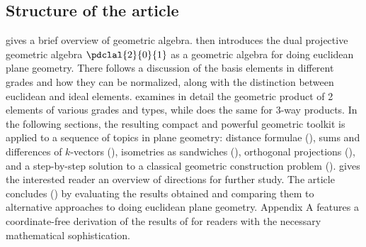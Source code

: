 \documentclass[12pt]{article}
\begin{document}
\subsection{Structure of the article} 
{
 gives a brief overview of geometric algebra.  then introduces the dual projective geometric algebra $\pdclal{2}{0}{1}$ as a geometric algebra for doing euclidean plane geometry. There follows a discussion of the basis elements in different grades and how they can be normalized,  along with the distinction between euclidean and ideal elements.   examines in detail the geometric product of 2  elements of various grades and types, while  does the same for 3-way products.   In the following sections, the resulting  compact and powerful geometric toolkit  is  applied to a sequence of topics in plane geometry:  distance formulae (), sums and differences of $k$-vectors (), isometries as sandwiches (), %
orthogonal projections (),  %
and a step-by-step solution to a classical geometric construction problem (). %
  gives the interested reader an overview of directions for further study.
The article concludes () by evaluating the results obtained and comparing them to alternative approaches to doing euclidean plane  geometry.  Appendix A features a coordinate-free derivation of the results of  for readers with the necessary mathematical sophistication.
}
 \vspace{-.05in}
\end{document}

